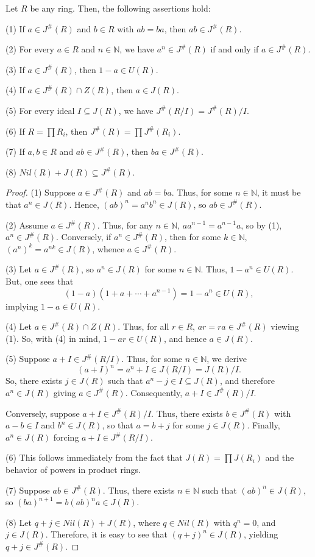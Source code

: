 \documentclass[10pt,a4paper]{amsart}
\begin{document}
\begin{lemma}\label{1.2}
Let $R$ be any ring. Then, the following assertions hold:

(1) If $a \in J^{\#}(R)$ and $b \in R$ with $ab = ba$, then $ab \in J^{\#}(R)$.
		
(2) For every $a \in R$ and $n \in \mathbb{N}$, we have $a^n \in J^{\#}(R)$ if and only if $a \in J^{\#}(R)$.
		
(3) If $a \in J^{\#}(R)$, then $1 - a \in U(R)$.
		
(4) If $a \in J^{\#}(R) \cap Z(R)$, then $a \in J(R)$.
		
(5) For every ideal $I \subseteq J(R)$, we have $J^{\#}(R/I) = J^{\#}(R)/I$.
		
(6) If $R = \prod R_i$, then $J^{\#}(R) = \prod J^{\#}(R_i)$.

(7) If $a, b\in R$ and $ab\in J^{\#}(R)$, then $ba\in J^{\#}(R)$.

(8) $Nil(R) + J(R) \subseteq J^{\#}(R)$.
\end{lemma}

\begin{proof}
(1) Suppose $a \in J^{\#}(R)$ and $ab = ba$. Thus, for some $n \in \mathbb{N}$, it must be that $a^n \in J(R)$. Hence, $(ab)^n = a^n b^n \in J(R)$, so $ab \in J^{\#}(R)$.
		
(2) Assume $a \in J^{\#}(R)$. Thus, for any $n \in \mathbb{N}$, $aa^{n-1} = a^{n-1}a$, so by (1), $a^n \in J^{\#}(R)$. Conversely, if $a^n \in J^{\#}(R)$, then for some $k \in \mathbb{N}$, $(a^n)^k = a^{nk} \in J(R)$, whence $a \in J^{\#}(R)$.
		
(3) Let $a \in J^{\#}(R)$, so $a^n \in J(R)$ for some $n \in \mathbb{N}$. Thus, $1 - a^n \in U(R)$. But, one sees that
\[
		(1 - a)(1 + a + \cdots + a^{n-1}) = 1 - a^n \in U(R),
\]
implying $1 - a \in U(R)$.
		
(4) Let $a \in J^{\#}(R) \cap Z(R)$. Thus, for all $r \in R$, $ar = ra \in J^{\#}(R)$ viewing (1). So, with (4) in mind, $1 - ar \in U(R)$, and hence $a \in J(R)$.
		
(5) Suppose $a + I \in J^{\#}(R/I)$. Thus, for some $n \in \mathbb{N}$, we derive
\[
		(a + I)^n = a^n + I \in J(R/I) = J(R)/I.
\]
So, there exists $j \in J(R)$ such that $a^n - j \in I \subseteq J(R)$, and therefore $a^n \in J(R)$ giving $a \in J^{\#}(R)$. Consequently, $a + I \in J^{\#}(R)/I$.
		
Conversely, suppose $a + I \in J^{\#}(R)/I$. Thus, there exists $b \in J^{\#}(R)$ with $a - b \in I$ and $b^n \in J(R)$, so that $a = b + j$ for some $j \in J(R)$. Finally, $a^n \in J(R)$ forcing $a + I \in J^{\#}(R/I)$.
		
(6) This follows immediately from the fact that $J(R) = \prod J(R_i)$ and the behavior of powers in product rings.

(7) Suppose $ab\in J^{\#}(R)$. Thus, there exists $n\in \mathbb{N}$ such that $(ab)^n\in J(R)$, so $(ba)^{n+1}=b(ab)^na\in J(R)$.

(8) Let $q + j \in Nil(R) + J(R)$, where $q \in Nil(R)$ with $q^n = 0$, and $j \in J(R)$. Therefore, it is easy to see that $(q + j)^n \in J(R)$, yielding $q + j \in J^{\#}(R)$.
\end{proof}
\end{document}
